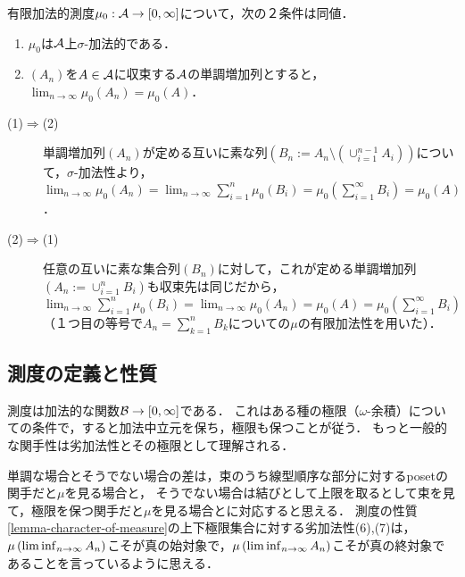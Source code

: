 \documentclass[uplatex, dvipdfmx]{jsreport}
\begin{document}
\begin{lemma}\label{lemma-sigma-additivity-of-finitely-additive-measure-in-terms-of-monotone-sequence}
    有限加法的測度$\mu_0:\mathcal{A}\to[0,\infty]$について，次の２条件は同値．
    \begin{enumerate}
        \item $\mu_0$は$\mathcal{A}$上$\sigma$-加法的である．
        \item $(A_n)$を$A\in\mathcal{A}$に収束する$\mathcal{A}$の単調増加列とすると，$\lim_{n\to\infty}\mu_0(A_n)=\mu_0(A)$．
    \end{enumerate}
\end{lemma}
\begin{Proof}\mbox{}
    \begin{description}
        \item[(1)$\Rightarrow$(2)] 単調増加列$(A_n)$が定める互いに素な列$(B_n:=A_n\setminus(\cup_{i=1}^{n-1}A_i))$について，$\sigma$-加法性より，$\lim_{n\to\infty}\mu_0(A_n)=\lim_{n\to\infty}\sum^n_{i=1}\mu_0(B_i)=\mu_0(\sum^\infty_{i=1}B_i)=\mu_0(A)$．
        \item[(2)$\Rightarrow$(1)] 任意の互いに素な集合列$(B_n)$に対して，これが定める単調増加列$(A_n:=\cup_{i=1}^nB_i)$も収束先は同じだから，$\lim_{n\to\infty}\sum^n_{i=1}\mu_0(B_i)=\lim_{n\to\infty}\mu_0(A_n)=\mu_0(A)=\mu_0(\sum^\infty_{i=1}B_i)$（１つ目の等号で$A_n=\sum_{k=1}^nB_k$についての$\mu$の有限加法性を用いた）．
    \end{description}
\end{Proof}

\subsection{測度の定義と性質}

\begin{tcolorbox}[colframe=ForestGreen, colback=ForestGreen!10!white,breakable,colbacktitle=ForestGreen!40!white,coltitle=black,fonttitle=\bfseries\sffamily,
title=]
    測度は加法的な関数$\mathcal{B}\to[0,\infty]$である．
    これはある種の極限（$\omega$-余積）についての条件で，すると加法中立元を保ち，極限も保つことが従う．
    もっと一般的な関手性は劣加法性とその極限として理解される．

    単調な場合とそうでない場合の差は，束のうち線型順序な部分に対するposetの関手だと$\mu$を見る場合と，
    そうでない場合は結びとして上限を取るとして束を見て，極限を保つ関手だと$\mu$を見る場合とに対応すると思える．
    測度の性質\ref{lemma-character-of-measure}の上下極限集合に対する劣加法性(6),(7)は，$\mu\left(\liminf_{n\to\infty}A_n\right)$こそが真の始対象で，$\mu\left(\liminf_{n\to\infty}A_n\right)$こそが真の終対象であることを言っているように思える．
\end{tcolorbox}
\end{document}
